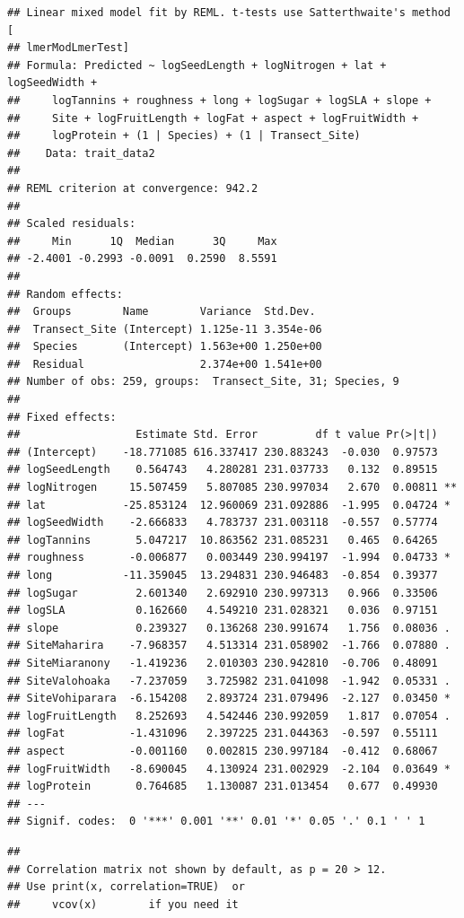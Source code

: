 \documentclass[
  12pt,
]{article}
\begin{document}
\begin{verbatim}
## Linear mixed model fit by REML. t-tests use Satterthwaite's method [
## lmerModLmerTest]
## Formula: Predicted ~ logSeedLength + logNitrogen + lat + logSeedWidth +  
##     logTannins + roughness + long + logSugar + logSLA + slope +  
##     Site + logFruitLength + logFat + aspect + logFruitWidth +  
##     logProtein + (1 | Species) + (1 | Transect_Site)
##    Data: trait_data2
## 
## REML criterion at convergence: 942.2
## 
## Scaled residuals: 
##     Min      1Q  Median      3Q     Max 
## -2.4001 -0.2993 -0.0091  0.2590  8.5591 
## 
## Random effects:
##  Groups        Name        Variance  Std.Dev. 
##  Transect_Site (Intercept) 1.125e-11 3.354e-06
##  Species       (Intercept) 1.563e+00 1.250e+00
##  Residual                  2.374e+00 1.541e+00
## Number of obs: 259, groups:  Transect_Site, 31; Species, 9
## 
## Fixed effects:
##                  Estimate Std. Error         df t value Pr(>|t|)   
## (Intercept)    -18.771085 616.337417 230.883243  -0.030  0.97573   
## logSeedLength    0.564743   4.280281 231.037733   0.132  0.89515   
## logNitrogen     15.507459   5.807085 230.997034   2.670  0.00811 **
## lat            -25.853124  12.960069 231.092886  -1.995  0.04724 * 
## logSeedWidth    -2.666833   4.783737 231.003118  -0.557  0.57774   
## logTannins       5.047217  10.863562 231.085231   0.465  0.64265   
## roughness       -0.006877   0.003449 230.994197  -1.994  0.04733 * 
## long           -11.359045  13.294831 230.946483  -0.854  0.39377   
## logSugar         2.601340   2.692910 230.997313   0.966  0.33506   
## logSLA           0.162660   4.549210 231.028321   0.036  0.97151   
## slope            0.239327   0.136268 230.991674   1.756  0.08036 . 
## SiteMaharira    -7.968357   4.513314 231.058902  -1.766  0.07880 . 
## SiteMiaranony   -1.419236   2.010303 230.942810  -0.706  0.48091   
## SiteValohoaka   -7.237059   3.725982 231.041098  -1.942  0.05331 . 
## SiteVohiparara  -6.154208   2.893724 231.079496  -2.127  0.03450 * 
## logFruitLength   8.252693   4.542446 230.992059   1.817  0.07054 . 
## logFat          -1.431096   2.397225 231.044363  -0.597  0.55111   
## aspect          -0.001160   0.002815 230.997184  -0.412  0.68067   
## logFruitWidth   -8.690045   4.130924 231.002929  -2.104  0.03649 * 
## logProtein       0.764685   1.130087 231.013454   0.677  0.49930   
## ---
## Signif. codes:  0 '***' 0.001 '**' 0.01 '*' 0.05 '.' 0.1 ' ' 1
\end{verbatim}

\begin{verbatim}
## 
## Correlation matrix not shown by default, as p = 20 > 12.
## Use print(x, correlation=TRUE)  or
##     vcov(x)        if you need it
\end{verbatim}
\end{document}
